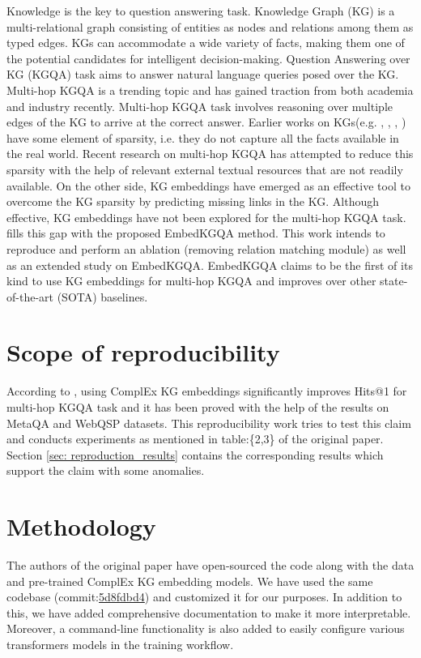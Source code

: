 Knowledge is the key to question answering task. Knowledge Graph (KG) is a multi-relational
graph consisting of entities as nodes and relations among them as typed edges. KGs can accommodate a wide variety of facts, making them one of the potential candidates for intelligent decision-making. Question Answering over KG (KGQA) task aims to answer natural language queries posed over the KG. Multi-hop KGQA is a trending topic and has gained traction from both academia and industry recently. Multi-hop KGQA task involves reasoning over multiple edges of the KG to arrive at the correct answer. Earlier works on KGs(e.g. \cite{yago}, \cite{freebase:datadumps}, \cite{dbpedia2015}, \cite{NELL}) have some element of sparsity, i.e. they do not capture all the facts available in the real world. Recent research on multi-hop KGQA has attempted to reduce this sparsity with the help of relevant external textual resources that are not readily available. On the other side, KG embeddings have emerged as an effective tool to overcome the KG sparsity by predicting missing links in the KG. Although effective, KG embeddings have not been explored for the multi-hop KGQA task. \cite{saxena-etal-2020-improving} fills this gap with the proposed EmbedKGQA method. This work intends to reproduce and perform an ablation (removing relation matching module) as well as an extended study on EmbedKGQA\cite{saxena-etal-2020-improving}. EmbedKGQA claims to be the first of its kind to use KG embeddings for multi-hop KGQA and improves over other state-of-the-art (SOTA) baselines.

\section{Scope of reproducibility}
\label{sec:claims}

According to \cite{saxena-etal-2020-improving}, using ComplEx \cite{ComplEx2016} KG embeddings significantly improves Hits@1 for multi-hop KGQA task and it has been proved with the help of the results on MetaQA \cite{metaqa-dataset} and WebQSP \cite{webqsp-dataset} datasets. This reproducibility work tries to test this claim and conducts experiments as mentioned in table:\{2,3\} of the original paper. Section \ref{sec: reproduction_results} contains the corresponding results which support the claim with some anomalies.

\section{Methodology}
The authors of the original paper have open-sourced the code along with the data and pre-trained ComplEx KG embedding models. We have used the same codebase (commit:\href{https://github.com/malllabiisc/EmbedKGQA/tree/5d8fdbd4be77fdcb2e67a0dc8a7115844606175a}{5d8fdbd4}) and customized it for our purposes. In addition to this, we have added comprehensive documentation to make it more interpretable. Moreover, a command-line functionality is also added to easily configure various transformers models in the training workflow.


